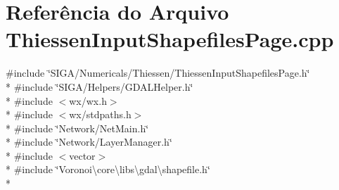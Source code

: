 \section{Referência do Arquivo Thiessen\+Input\+Shapefiles\+Page.\+cpp}
\label{_thiessen_input_shapefiles_page_8cpp}
{\ttfamily \#include \char`\"{}S\+I\+G\+A/\+Numericals/\+Thiessen/\+Thiessen\+Input\+Shapefiles\+Page.\+h\char`\"{}}\\*
{\ttfamily \#include \char`\"{}S\+I\+G\+A/\+Helpers/\+G\+D\+A\+L\+Helper.\+h\char`\"{}}\\*
{\ttfamily \#include $<$wx/wx.\+h$>$}\\*
{\ttfamily \#include $<$wx/stdpaths.\+h$>$}\\*
{\ttfamily \#include \char`\"{}Network/\+Net\+Main.\+h\char`\"{}}\\*
{\ttfamily \#include \char`\"{}Network/\+Layer\+Manager.\+h\char`\"{}}\\*
{\ttfamily \#include $<$vector$>$}\\*
{\ttfamily \#include \char`\"{}Voronoi\textbackslash{}core\textbackslash{}libs\textbackslash{}gdal\textbackslash{}shapefile.\+h\char`\"{}}\\*
